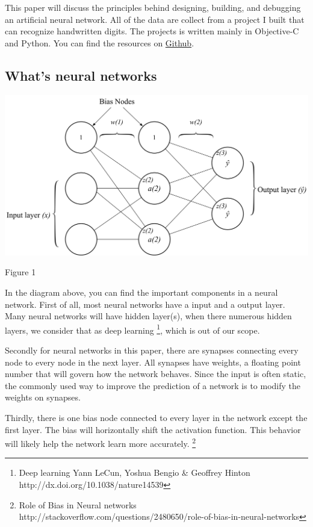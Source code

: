 \documentclass[]{article}
\begin{document}
\begin{multicols}{2}
This paper will discuss the principles behind designing, building, and
debugging an artificial neural network. All of the data are collect from a project I built that can recognize handwritten digits. The projects is written mainly in Objective-C and Python. You can find the resources on
\href{https://github.com/NeilNie/Neural-Network-Research}{Github}.

\subsection{What's neural networks}

\centerline{\includegraphics[width=1\linewidth]{nn} }
\centerline{Figure 1}
\vspace{0.5cm}

In the diagram above, you can find the important components in a neural network. First of all, most neural networks have a input and a output layer. Many neural networks will have hidden layer(s), when there numerous hidden layers, we consider that as deep learning \footnote{Deep learning Yann LeCun, Yoshua Bengio \& Geoffrey Hinton http://dx.doi.org/10.1038/nature14539}, which is out of our scope. 

Secondly for neural networks in this paper, there are synapses connecting every node to every node in the next layer. All synapses have weights, a floating point number that will govern how the network behaves. Since the input is often static, the commonly used way to improve the prediction of a network is to modify the weights on synapses. 

Thirdly, there is one bias node connected to every layer in the network except the first layer. The bias will horizontally shift the activation function. This behavior will likely help the network learn more accurately. \footnote{Role of Bias in Neural  networks http://stackoverflow.com/questions/2480650/role-of-bias-in-neural-networks}


\end{multicols}
\end{document}
